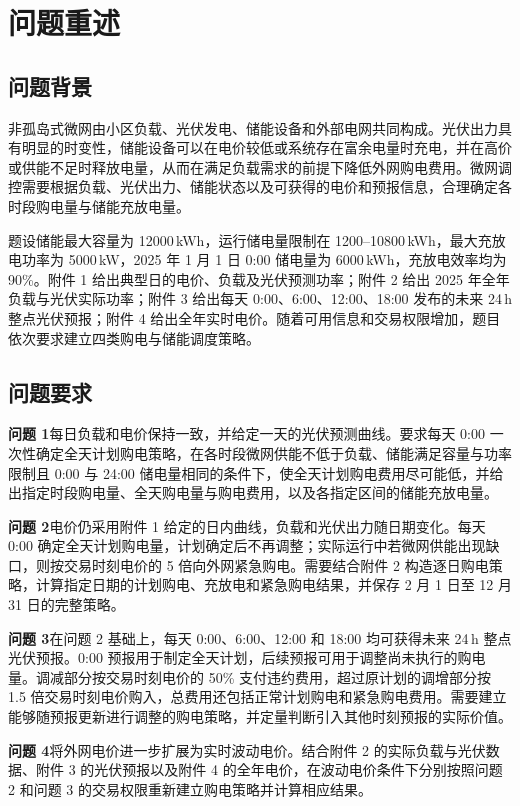 \section{问题重述}
\subsection{问题背景}
非孤岛式微网由小区负载、光伏发电、储能设备和外部电网共同构成。光伏出力具有明显的时变性，储能设备可以在电价较低或系统存在富余电量时充电，并在高价或供能不足时释放电量，从而在满足负载需求的前提下降低外网购电费用。微网调控需要根据负载、光伏出力、储能状态以及可获得的电价和预报信息，合理确定各时段购电量与储能充放电量。

题设储能最大容量为 12000\,kWh，运行储电量限制在 1200--10800\,kWh，最大充放电功率为 5000\,kW，2025 年 1 月 1 日 0:00 储电量为 6000\,kWh，充放电效率均为 90\%。附件 1 给出典型日的电价、负载及光伏预测功率；附件 2 给出 2025 年全年负载与光伏实际功率；附件 3 给出每天 0:00、6:00、12:00、18:00 发布的未来 24\,h 整点光伏预报；附件 4 给出全年实时电价。随着可用信息和交易权限增加，题目依次要求建立四类购电与储能调度策略。

\subsection{问题要求}
\textbf{问题 1}\quad 每日负载和电价保持一致，并给定一天的光伏预测曲线。要求每天 0:00 一次性确定全天计划购电策略，在各时段微网供能不低于负载、储能满足容量与功率限制且 0:00 与 24:00 储电量相同的条件下，使全天计划购电费用尽可能低，并给出指定时段购电量、全天购电量与购电费用，以及各指定区间的储能充放电量。

\textbf{问题 2}\quad 电价仍采用附件 1 给定的日内曲线，负载和光伏出力随日期变化。每天 0:00 确定全天计划购电量，计划确定后不再调整；实际运行中若微网供能出现缺口，则按交易时刻电价的 5 倍向外网紧急购电。需要结合附件 2 构造逐日购电策略，计算指定日期的计划购电、充放电和紧急购电结果，并保存 2 月 1 日至 12 月 31 日的完整策略。

\textbf{问题 3}\quad 在问题 2 基础上，每天 0:00、6:00、12:00 和 18:00 均可获得未来 24\,h 整点光伏预报。0:00 预报用于制定全天计划，后续预报可用于调整尚未执行的购电量。调减部分按交易时刻电价的 50\% 支付违约费用，超过原计划的调增部分按 1.5 倍交易时刻电价购入，总费用还包括正常计划购电和紧急购电费用。需要建立能够随预报更新进行调整的购电策略，并定量判断引入其他时刻预报的实际价值。

\textbf{问题 4}\quad 将外网电价进一步扩展为实时波动电价。结合附件 2 的实际负载与光伏数据、附件 3 的光伏预报以及附件 4 的全年电价，在波动电价条件下分别按照问题 2 和问题 3 的交易权限重新建立购电策略并计算相应结果。
